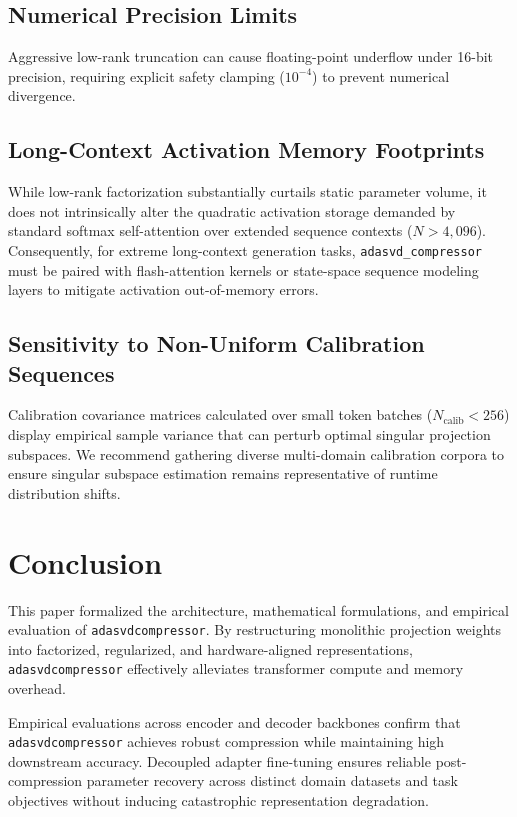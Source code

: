 \documentclass{article}
\begin{document}
\subsection{Numerical Precision Limits}
Aggressive low-rank truncation can cause floating-point underflow under 16-bit precision, requiring explicit safety clamping ($10^{-4}$) to prevent numerical divergence.

\subsection{Long-Context Activation Memory Footprints}
While low-rank factorization substantially curtails static parameter volume, it does not intrinsically alter the quadratic activation storage demanded by standard softmax self-attention over extended sequence contexts ($N > 4{,}096$). Consequently, for extreme long-context generation tasks, \texttt{adasvd\_compressor} must be paired with flash-attention kernels or state-space sequence modeling layers to mitigate activation out-of-memory errors.

\subsection{Sensitivity to Non-Uniform Calibration Sequences}
Calibration covariance matrices calculated over small token batches ($N_{\text{calib}} < 256$) display empirical sample variance that can perturb optimal singular projection subspaces. We recommend gathering diverse multi-domain calibration corpora to ensure singular subspace estimation remains representative of runtime distribution shifts.


\section{Conclusion}
This paper formalized the architecture, mathematical formulations, and empirical evaluation of \texttt{adasvdcompressor}. By restructuring monolithic projection weights into factorized, regularized, and hardware-aligned representations, \texttt{adasvdcompressor} effectively alleviates transformer compute and memory overhead.

Empirical evaluations across encoder and decoder backbones confirm that \texttt{adasvdcompressor} achieves robust compression while maintaining high downstream accuracy. Decoupled adapter fine-tuning ensures reliable post-compression parameter recovery across distinct domain datasets and task objectives without inducing catastrophic representation degradation.
\end{document}
